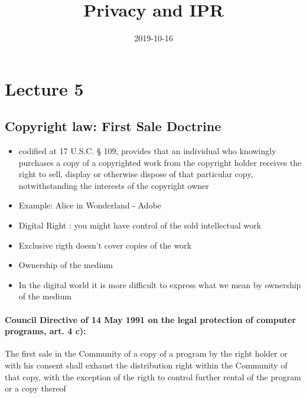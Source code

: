 \documentclass{article}
\title{Privacy and IPR}
\date{2019-10-16}
\begin{document}
   \maketitle 
   \newpage

\section{Lecture 5}

\subsection{Copyright law: First Sale Doctrine}
\begin{itemize}
\item  codified at 17 U.S.C. § 109, provides that an individual who knowingly purchases a copy of a copyrighted work from the copyright holder receives the right to sell, display or otherwise dispose of that particular copy, notwithstanding the interests of the copyright owner
\item Example: Alice in Wonderland - Adobe
\item Digital Right : you might have control of the sold intellectual work 
\item Exclusive rigth doesn't cover copies of the work 
\item Ownership of the medium 
\item In the digital world it is more difficult to express what we mean by ownership of the medium 
\end{itemize}

\paragraph{Council Directive of 14 May 1991 on the legal protection of computer programs, art. 4 c):}
The first sale in the Community of a copy of a program by the right holder or with his consent shall exhaust the distribution right within the Community of that copy, with the exception of the rigth to control further rental of the program or a copy thereof
\end{document}
